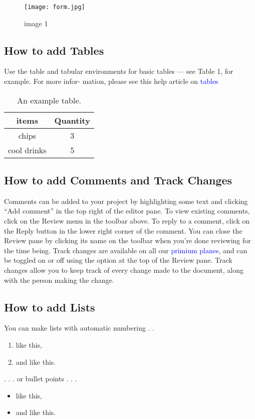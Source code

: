 \documentclass{article}
\begin{document}
	\begin{figure}[h]
		\centering
		\texttt{[image: form.jpg]}
		\caption{image 1}
	\end{figure}

	\subsection{How to add Tables}
	Use the table and tabular environments for basic tables — see Table 1, for example. For more infor-
	mation, please see this help article on \textcolor{blue}{tables}
	
	\begin{table}[h]
		\centering
		\begin{tabular}{|c|c|}
			\hline
			\textbf{items}& \textbf{Quantity}\\
			\hline
			chips & 3\\
			\hline
			cool drinks & 5\\
			\hline
		\end{tabular}
		\caption{An example table.}
	\end{table}
	
	
	
	\subsection{How to add Comments and Track Changes}
	Comments can be added to your project by highlighting some text and clicking “Add comment” in
	the top right of the editor pane. To view existing comments, click on the Review menu in the toolbar
	above. To reply to a comment, click on the Reply button in the lower right corner of the comment.
	You can close the Review pane by clicking its name on the toolbar when you’re done reviewing for the
	time being.
	Track changes are available on all our \textcolor{blue}{primium planes}, and can be toggled on or off using the option
	at the top of the Review pane. Track changes allow you to keep track of every change made to the
	document, along with the person making the change.
	\subsection{How to add Lists}
	You can make lists with automatic numbering . . 
	\begin{enumerate}
		\item like this,
		\item and like this.
	\end{enumerate}
	. . . or bullet points . . .
	\begin{itemize}
		\item like this,
		\item and like this.
	\end{itemize}
	
\end{document}
